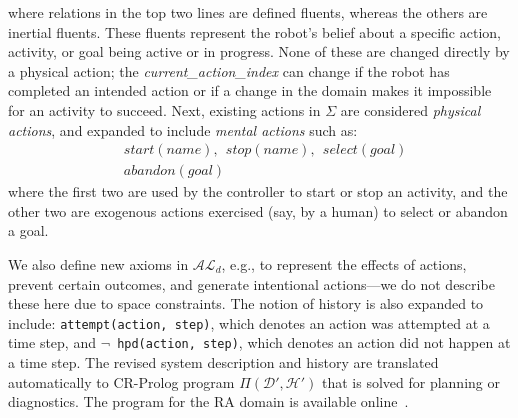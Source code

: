 \documentclass[letterpaper, 10 pt, conference]{ieeeconf}  %
\newcommand{\stt}[1]{{\small\texttt{#1}}}
\begin{document}
where relations in the top two lines are defined fluents, whereas the
others are inertial fluents. These fluents represent the robot's
belief about a specific action, activity, or goal being active or in
progress. None of these are changed directly by a physical action; the
\emph{current\_action\_index} can change if the robot has completed an
intended action or if a change in the domain makes it impossible for
an activity to succeed. Next, existing actions in $\Sigma$ are
considered \emph{physical actions}, and expanded to include
\emph{mental actions} such as:
\begin{align*}
  &start(name),~~stop(name),~~select(goal)\\
  &abandon(goal)
\end{align*}
where the first two are used by the controller to start or stop an
activity, and the other two are exogenous actions exercised (say, by a
human) to select or abandon a goal.

We also define new axioms in $\mathcal{AL}_d$, e.g., to represent the
effects of actions, prevent certain outcomes, and generate intentional
actions---we do not describe these here due to space constraints. The
notion of history is also expanded to include: \stt{attempt(action,
  step)}, which denotes an action was attempted at a time step, and
\stt{$\neg$~hpd(action, step)}, which denotes an action did not happen
at a time step. The revised system description and history are
translated automatically to CR-Prolog program $\Pi(\mathcal{D}',
\mathcal{H}')$ that is solved for planning or diagnostics. The program
for the RA domain is available online~\cite{code-results}.

\end{document}
